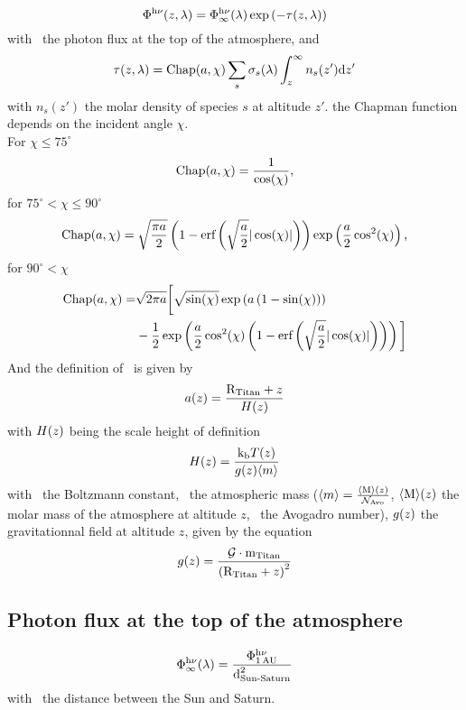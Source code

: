 \begin{equation}
\Phi^{\mathrm{h}\nu}(z,\lambda) = \Phi^{\mathrm{h}\nu}_\infty(\lambda) \exp\left(-\tau(z,\lambda)\right)
\end{equation}
with \fhvtop\ the photon flux at the top of the atmosphere, and
\begin{equation}
\tau(z,\lambda) = \text{Chap}(a,\chi)\sum_s\sigma_s(\lambda)\int_z^\infty n_s(z')\mathrm{d} z'
\end{equation}
with $n_s(z')$ the molar density of species $s$ at altitude $z'$.
the Chapman function depends on the
incident angle $\chi$.\\
For $\chi \le 75^\circ$
\begin{equation}
\text{Chap}(a,\chi) =  \frac{1}{\cos(\chi)},
\end{equation}
for $75^\circ < \chi \le 90^\circ$
\begin{equation}
\text{Chap}(a,\chi) = \sqrt{\frac{\pi a}{2}} 
                \left(1 - \text{erf}\left(\sqrt{\frac{a}{2}}|\cos(\chi)|\right)\right)\exp\left(\frac{a}{2}\cos^2(\chi)\right),
\end{equation}
for $90^\circ < \chi$
\begin{equation}
\begin{split}
\text{Chap}(a,\chi) = & \sqrt{2\pi a}\bigg[\sqrt{\sin(\chi)}\exp\left(a\left(1-\sin(\chi)\right)\right) \\
           &  -\frac{1}{2}\exp\left(\frac{a}{2}\cos^2(\chi)\left(1-\text{erf}\left(\sqrt{\frac{a}{2}}|\cos(\chi)|\right)\right)\right)\bigg]
\end{split}
\end{equation}
And the definition of \x\ is given by
\begin{equation}
a(z) = \frac{\text{R}_\text{Titan} + z}{H(z)}
\end{equation}
with $H(z)$ being the scale height of definition
\begin{equation}
H(z) = \frac{\text{k}_\text{b} T(z)}{g(z)\langle m\rangle}
\label{Titan:scale_height}
\end{equation}
with \kb\ the Boltzmann constant, 
\mean{\mass}\ the atmospheric mass ($\langle m\rangle = \frac{\langle\text{M}\rangle(z)}{\mathcal{N}_\text{Avo}}$, 
$\langle\text{M}\rangle(z)$ the molar mass of the atmosphere at altitude $z$,
\Nav\ the Avogadro number), 
$g(z)$ the gravitationnal field at altitude $z$, given by the equation
\begin{equation}
g(z) = \frac{\mathcal{G}\cdot\text{m}_\text{Titan}}{\left(\text{R}_\text{Titan} + z\right)^2}
\label{gfield}
\end{equation}

\subsection{Photon flux at the top of the atmosphere}
\begin{equation}
\Phi^{\mathrm{h}\nu}_\infty(\lambda) = \frac{\Phi^{\mathrm{h}\nu}_\text{1\,AU}}{\text{d}_\text{Sun-Saturn}^2}
\end{equation}
with \dSS\ the distance between the Sun and Saturn.

